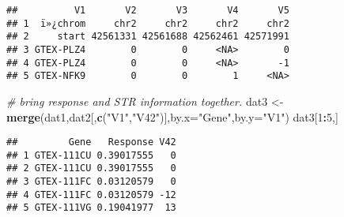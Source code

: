 \documentclass[
]{article}
\newenvironment{Shaded}{\begin{snugshade}}{\end{snugshade}}
\newcommand{\CommentTok}[1]{\textcolor[rgb]{0.56,0.35,0.01}{\textit{#1}}}
\newcommand{\DataTypeTok}[1]{\textcolor[rgb]{0.13,0.29,0.53}{#1}}
\newcommand{\DecValTok}[1]{\textcolor[rgb]{0.00,0.00,0.81}{#1}}
\newcommand{\KeywordTok}[1]{\textcolor[rgb]{0.13,0.29,0.53}{\textbf{#1}}}
\newcommand{\NormalTok}[1]{#1}
\newcommand{\OperatorTok}[1]{\textcolor[rgb]{0.81,0.36,0.00}{\textbf{#1}}}
\newcommand{\StringTok}[1]{\textcolor[rgb]{0.31,0.60,0.02}{#1}}
\begin{document}
\begin{verbatim}
##          V1       V2       V3       V4       V5
## 1  ï»¿chrom     chr2     chr2     chr2     chr2
## 2     start 42561331 42561688 42562461 42571991
## 3 GTEX-PLZ4        0        0     <NA>        0
## 4 GTEX-PLZ4        0        0     <NA>       -1
## 5 GTEX-NFK9        0        0        1     <NA>
\end{verbatim}

\begin{Shaded}
\begin{Highlighting}[]
\CommentTok{# bring response and STR information together.}
\NormalTok{dat3 <-}\StringTok{ }\KeywordTok{merge}\NormalTok{(dat1,dat2[,}\KeywordTok{c}\NormalTok{(}\StringTok{"V1"}\NormalTok{,}\StringTok{"V42"}\NormalTok{)],}\DataTypeTok{by.x=}\StringTok{"Gene"}\NormalTok{,}\DataTypeTok{by.y=}\StringTok{"V1"}\NormalTok{)}
\NormalTok{dat3[}\DecValTok{1}\OperatorTok{:}\DecValTok{5}\NormalTok{,]}
\end{Highlighting}
\end{Shaded}

\begin{verbatim}
##         Gene   Response V42
## 1 GTEX-111CU 0.39017555   0
## 2 GTEX-111CU 0.39017555   0
## 3 GTEX-111FC 0.03120579   0
## 4 GTEX-111FC 0.03120579 -12
## 5 GTEX-111VG 0.19041977  13
\end{verbatim}

\begin{Shaded}
\end{Shaded}
\end{document}
